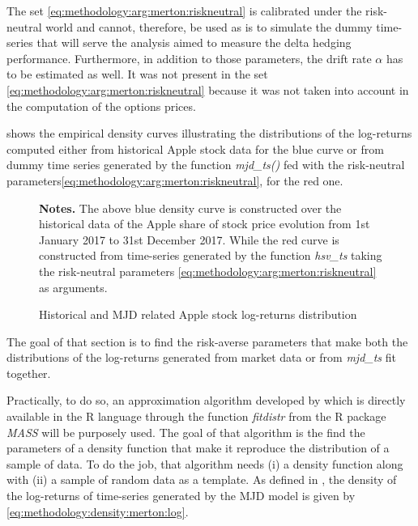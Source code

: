 \documentclass[12pt,a4paper]{report}
\begin{document}
The set \ref{eq:methodology:arg:merton:riskneutral} is calibrated under the risk-neutral world and cannot, therefore, be used as is to simulate the dummy time-series that will serve the analysis aimed to measure the delta hedging performance.
Furthermore, in addition to those parameters, the drift rate $\alpha$ has to be estimated as well. It was not present in the set  \ref{eq:methodology:arg:merton:riskneutral} because it was not taken into account in the computation of the options prices.

 shows the empirical density curves illustrating the distributions of the log-returns computed either from historical Apple stock data for the blue curve or from dummy time series generated by the function \textit{mjd\_ts()} fed with the risk-neutral parameters\ref{eq:methodology:arg:merton:riskneutral}, for the red one.


\begin{figure}[h]
  \centering
  
  \caption{Historical and MJD related Apple stock log-returns distribution}
  \begin{changemargin}{0.5cm}{0.5cm}
  \medskip
\footnotesize
{}\textbf{Notes.}  The above blue density curve is constructed over the historical data of the Apple share of stock price evolution from 1st January 2017 to 31st December 2017. While the red curve is constructed from time-series generated by the function \textit{hsv\_ts} taking the risk-neutral parameters \ref{eq:methodology:arg:merton:riskneutral} as arguments. 
\end{changemargin}
  \label{p:methodology:density:aapl:merton:riskneutral}
\end{figure}



The goal of that section is to find the risk-averse parameters that make both the distributions of the log-returns generated from market data or from \textit{mjd\_ts} fit together.

Practically, to do so, an approximation algorithm developed by \citet{MASS} which is directly available in the R language through the function \textit{fitdistr} from the R package \textit{MASS} will be purposely used. 
The goal of that algorithm is the find the parameters of a density function that make it reproduce the distribution of a sample of data.
To do the job, that algorithm needs (i) a density function along with (ii) a sample of random data as a template.
As defined in \citet{matsuda2004}, the density of the log-returns of time-series generated by the MJD model is given by \cref{eq:methodology:density:merton:log}.
\end{document}
